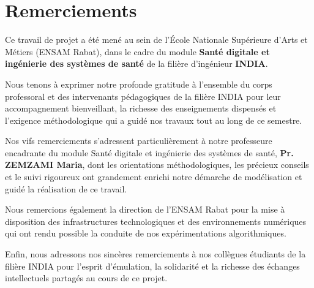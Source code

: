 \chapter*{Remerciements}

Ce travail de projet a été mené au sein de l'École Nationale Supérieure d'Arts et Métiers (ENSAM Rabat), dans le cadre du module \textbf{Santé digitale et ingénierie des systèmes de santé} de la filière d'ingénieur \textbf{INDIA}.

Nous tenons à exprimer notre profonde gratitude à l'ensemble du corps professoral et des intervenants pédagogiques de la filière INDIA pour leur accompagnement bienveillant, la richesse des enseignements dispensés et l'exigence méthodologique qui a guidé nos travaux tout au long de ce semestre.

Nos vifs remerciements s'adressent particulièrement à notre professeure encadrante du module Santé digitale et ingénierie des systèmes de santé, \textbf{Pr. ZEMZAMI Maria}, dont les orientations méthodologiques, les précieux conseils et le suivi rigoureux ont grandement enrichi notre démarche de modélisation et guidé la réalisation de ce travail.

Nous remercions également la direction de l'ENSAM Rabat pour la mise à disposition des infrastructures technologiques et des environnements numériques qui ont rendu possible la conduite de nos expérimentations algorithmiques.

Enfin, nous adressons nos sincères remerciements à nos collègues étudiants de la filière INDIA pour l'esprit d'émulation, la solidarité et la richesse des échanges intellectuels partagés au cours de ce projet.
